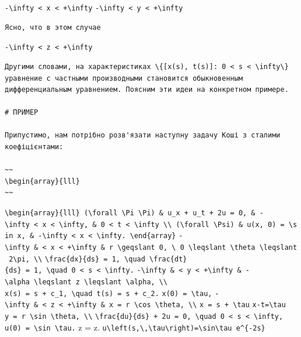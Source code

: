 \documentclass[
  ukrainian,
]{article}
\begin{document}
\texttt{-\textbackslash{}infty\ \textless{}\ x\ \textless{}\ +\textbackslash{}infty}
\texttt{-\textbackslash{}infty\ \textless{}\ y\ \textless{}\ +\textbackslash{}infty}

\begin{verbatim}
Ясно, что в этом случае
\end{verbatim}

\texttt{-\textbackslash{}infty\ \textless{}\ z\ \textless{}\ +\textbackslash{}infty}

\begin{verbatim}
Другими словами, на характеристиках \{[x(s), t(s)]: 0 < s < \infty\} уравнение с частными производными становится обыкновенным дифференциальным уравнением. Поясним эти идеи на конкретном примере.

# ПРИМЕР

Припустимо, нам потрібно розв'язати наступну задачу Коші з сталими коефіцієнтами:

~~
\begin{array}{lll}
~~
\end{verbatim}

\texttt{\textbackslash{}begin\{array\}\{lll\}\ (\textbackslash{}forall\ \textbackslash{}Pi\ \textbackslash{}Pi)\ \&\ u\_x\ +\ u\_t\ +\ 2u\ =\ 0,\ \&\ -\textbackslash{}infty\ \textless{}\ x\ \textless{}\ \textbackslash{}infty,\ \&\ 0\ \textless{}\ t\ \textless{}\ \textbackslash{}infty\ \textbackslash{}\textbackslash{}\ (\textbackslash{}forall\ \textbackslash{}Psi)\ \&\ u(x,\ 0)\ =\ \textbackslash{}sin\ x,\ \&\ -\textbackslash{}infty\ \textless{}\ x\ \textless{}\ \textbackslash{}infty.\ \textbackslash{}end\{array\}}
\texttt{-\textbackslash{}infty\ \&\ \textless{}\ x\ \textless{}\ +\textbackslash{}infty\ \&\ r\ \textbackslash{}geqslant\ 0,\ \textbackslash{}\ 0\ \textbackslash{}leqslant\ \textbackslash{}theta\ \textbackslash{}leqslant\ 2\textbackslash{}pi,\ \textbackslash{}\textbackslash{}}
\texttt{\textbackslash{}frac\{dx\}\{ds\}\ =\ 1,\ \textbackslash{}quad\ \textbackslash{}frac\{dt\}\{ds\}\ =\ 1,\ \textbackslash{}quad\ 0\ \textless{}\ s\ \textless{}\ \textbackslash{}infty.}
\texttt{-\textbackslash{}infty\ \&\ \textless{}\ y\ \textless{}\ +\textbackslash{}infty\ \&\ -\textbackslash{}alpha\ \textbackslash{}leqslant\ z\ \textbackslash{}leqslant\ \textbackslash{}alpha,\ \textbackslash{}\textbackslash{}}
\texttt{x(s)\ =\ s\ +\ c\_1,\ \textbackslash{}quad\ t(s)\ =\ s\ +\ c\_2.}
\texttt{x(0)\ =\ \textbackslash{}tau,}
\texttt{-\textbackslash{}infty\ \&\ \textless{}\ z\ \textless{}\ +\textbackslash{}infty\ \&\ x\ =\ r\ \textbackslash{}cos\ \textbackslash{}theta,\ \textbackslash{}\textbackslash{}}
\texttt{x\ =\ s\ +\ \textbackslash{}tau}
\texttt{x-t=\textbackslash{}tau}
\texttt{y\ =\ r\ \textbackslash{}sin\ \textbackslash{}theta,\ \textbackslash{}\textbackslash{}}
\texttt{\textbackslash{}frac\{du\}\{ds\}\ +\ 2u\ =\ 0,\ \textbackslash{}quad\ 0\ \textless{}\ s\ \textless{}\ \textbackslash{}infty,}
\texttt{u(0)\ =\ \textbackslash{}sin\ \textbackslash{}tau.} z = z.
\texttt{u\textbackslash{}left(s,\textbackslash{},\textbackslash{}tau\textbackslash{}right)=\textbackslash{}sin\textbackslash{}tau\ e\^{}\{-2s\}}
\end{document}
